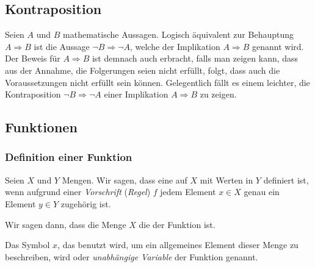 \subsection{Kontraposition}
Seien $A$ und $B$ mathematische Aussagen. Logisch äquivalent zur Behauptung $A\Rightarrow B$ ist die Aussage $\neg{B}\Rightarrow \neg{A}$, welche  der Implikation $A\Rightarrow B$ genannt wird.
Der Beweis für $A\Rightarrow B$ ist demnach auch erbracht, falls man zeigen kann, dass aus der Annahme, die Folgerungen seien nicht erfüllt, folgt, dass auch die Voraussetzungen nicht erfüllt sein können.
Gelegentlich fällt es einem leichter, die Kontraposition $\neg{B}\Rightarrow \neg{A}$ einer Implikation $A\Rightarrow B$ zu zeigen.


\subsection{Funktionen}
\subsubsection{Definition einer Funktion}
\begin{mydefinition}\label{mydefinition:funktion}
Seien $X$ und $Y$ Mengen. Wir sagen, dass eine  auf $X$ mit Werten in $Y$ definiert ist, wenn aufgrund einer \textit{Vorschrift} (\textit{Regel}) $f$ jedem Element $x\in X$ genau ein Element $y\in Y$ zugehörig ist.
\end{mydefinition}
Wir sagen dann, dass die Menge $X$ die  der Funktion ist.

Das Symbol $x$, das benutzt wird, um ein allgemeines Element dieser Menge zu beschreiben, wird  oder \textit{unabhängige Variable} der Funktion genannt.

